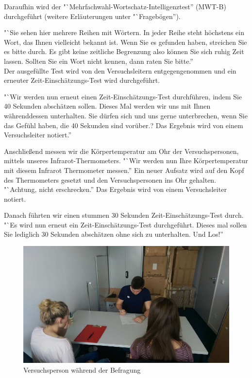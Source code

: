 \documentclass{Bericht}
\begin{document}
Daraufhin wird der "`Mehrfachwahl-Wortschatz-Intelligenztest'' (MWT-B) durchgeführt (weitere Erläuterungen unter "`Fragebögen''). 

"`Sie sehen hier mehrere Reihen mit Wörtern. In jeder Reihe steht höchstens ein Wort, das Ihnen vielleicht bekannt ist. Wenn Sie es gefunden haben, streichen Sie es bitte durch. Es  gibt keine zeitliche Begrenzung also können Sie sich ruhig Zeit lassen. Sollten Sie ein Wort nicht kennen, dann raten Sie bitte.'' \\
Der ausgefüllte Test wird von den Versuchsleitern entgegengenommen und ein erneuter Zeit-Einschätzungs-Test wird durchgeführt. 

"`Wir werden nun erneut einen Zeit-Einschätzungs-Test durchführen, indem Sie 40 Sekunden abschätzen sollen. Dieses Mal werden wir uns mit Ihnen währenddessen unterhalten. Sie dürfen sich und uns gerne unterbrechen, wenn Sie das Gefühl haben, die 40 Sekunden sind vorüber.? Das Ergebnis wird von einem Versuchsleiter notiert.''

Anschließend messen wir die Körpertemperatur am Ohr der Versuchspersonen, mittels unseres Infrarot-Thermometers. "`Wir werden nun Ihre Körpertemperatur mit diesem Infrarot Thermometer messen.'' Ein neuer Aufsatz wird auf den Kopf des Thermometers gesetzt und den Versuchspersonen ins Ohr gehalten. "`Achtung, nicht erschrecken.'' Das Ergebnis wird von einem Versuchsleiter notiert.

Danach führten wir einen stummen 30 Sekunden Zeit-Einschätzungs-Test durch. "`Es wird nun erneut ein Zeit-Einschätzungs-Test durchgeführt. Dieses mal sollen Sie lediglich 30 Sekunden abschätzen ohne sich zu unterhalten. Und Los!''

\begin{figure}[H]
	\centering    
	\includegraphics[height=\textheight, width=\linewidth, keepaspectratio]{../Bilder/t.jpg}
	\caption{Versuchsperson während der Befragung}
	\label{img:befragung}
\end{figure}
\end{document}
